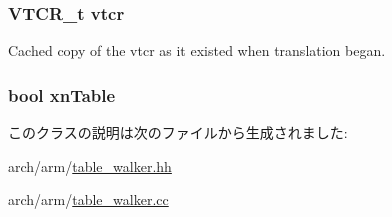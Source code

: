 \label{classArmISA_1_1TableWalker_1_1WalkerState_add293169f7f2ac526b3fa14f950cf0bb}
\hypertarget{classArmISA_1_1TableWalker_1_1WalkerState_a284bfeb0db142a055935ae3d133893d1}{
\subsubsection[{vtcr}]{\setlength{\rightskip}{0pt plus 5cm}VTCR\_\-t {\bf vtcr}}}
\label{classArmISA_1_1TableWalker_1_1WalkerState_a284bfeb0db142a055935ae3d133893d1}
Cached copy of the vtcr as it existed when translation began. \hypertarget{classArmISA_1_1TableWalker_1_1WalkerState_a34b92e09eece01cfa45e9b9d0b7f74c6}{
\subsubsection[{xnTable}]{\setlength{\rightskip}{0pt plus 5cm}bool {\bf xnTable}}}
\label{classArmISA_1_1TableWalker_1_1WalkerState_a34b92e09eece01cfa45e9b9d0b7f74c6}


このクラスの説明は次のファイルから生成されました:\begin{DoxyCompactItemize}
\item 
arch/arm/\hyperlink{table__walker_8hh}{table\_\-walker.hh}\item 
arch/arm/\hyperlink{table__walker_8cc}{table\_\-walker.cc}\end{DoxyCompactItemize}
